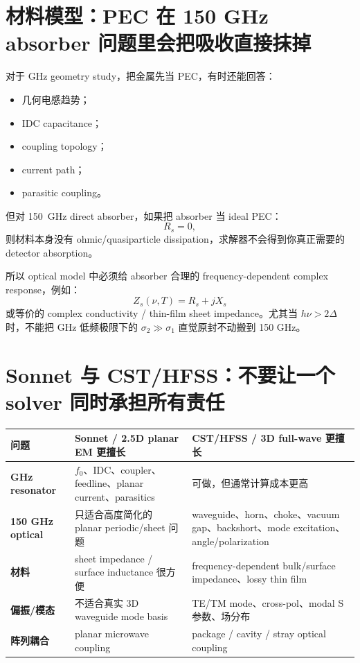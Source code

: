\documentclass[11pt,a4paper,openany]{ctexrep}
\begin{document}
\section{材料模型：PEC 在 150 GHz absorber 问题里会把吸收直接抹掉}

对于 GHz geometry study，把金属先当 PEC，有时还能回答：
\begin{itemize}
  \item 几何电感趋势；
  \item IDC capacitance；
  \item coupling topology；
  \item current path；
  \item parasitic coupling。
\end{itemize}

但对 \SI{150}{GHz} direct absorber，如果把 absorber 当 ideal PEC：
\[
R_s=0,
\]
则材料本身没有 ohmic/quasiparticle dissipation，求解器不会得到你真正需要的 detector absorption。

所以 optical model 中必须给 absorber 合理的 frequency-dependent complex response，例如：
\[
Z_s(\nu,T)=R_s+jX_s
\]
或等价的 complex conductivity / thin-film sheet impedance。尤其当 $h\nu>2\Delta$ 时，不能把 GHz 低频极限下的 $\sigma_2\gg\sigma_1$ 直觉原封不动搬到 150 GHz。

\section{Sonnet 与 CST/HFSS：不要让一个 solver 同时承担所有责任}

\begin{center}
\begin{tabularx}{0.96\linewidth}{>{\bfseries}p{28mm}XX}
\toprule
问题 & Sonnet / 2.5D planar EM 更擅长 & CST/HFSS / 3D full-wave 更擅长 \\
\midrule
GHz resonator & $f_0$、IDC、coupler、feedline、planar current、parasitics & 可做，但通常计算成本更高 \\
150 GHz optical & 只适合高度简化的 planar periodic/sheet 问题 & waveguide、horn、choke、vacuum gap、backshort、mode excitation、angle/polarization \\
材料 & sheet impedance / surface inductance 很方便 & frequency-dependent bulk/surface impedance、lossy thin film \\
偏振/模态 & 不适合真实 3D waveguide mode basis & TE/TM mode、cross-pol、modal S 参数、场分布 \\
阵列耦合 & planar microwave coupling & package / cavity / stray optical coupling \\
\bottomrule
\end{tabularx}
\end{center}
\end{document}
